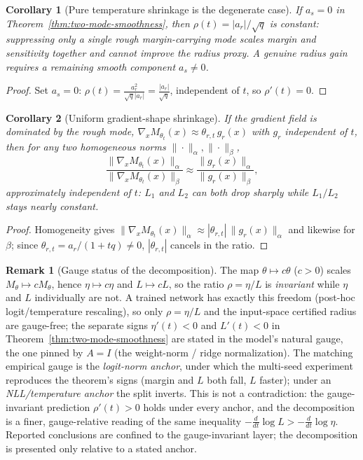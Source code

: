 \documentclass[11pt]{article}
\newtheorem{corollary}{Corollary}
\theoremstyle{definition}
\newtheorem{remark}{Remark}
\begin{document}
\begin{corollary}[Pure temperature shrinkage is the degenerate case]\label{cor:pure-temperature}
If $a_s=0$ in Theorem~\ref{thm:two-mode-smoothness}, then $\rho(t)=|a_r|/\sqrt q$ is constant: suppressing only a
single rough margin-carrying mode scales margin and sensitivity together and cannot improve the radius proxy.
A genuine radius gain requires a remaining smooth component $a_s\neq0$.
\end{corollary}
\begin{proof}
Set $a_s=0$: $\rho(t)=\tfrac{a_r^2}{\sqrt q|a_r|}=\tfrac{|a_r|}{\sqrt q}$, independent of $t$, so $\rho'(t)=0$.
\end{proof}

\begin{corollary}[Uniform gradient-shape shrinkage]\label{cor:gradient-shape}
If the gradient field is dominated by the rough mode, $\nabla_xM_{\theta_t}(x)\approx\theta_{r,t}\,g_r(x)$ with
$g_r$ independent of $t$, then for any two homogeneous norms $\|\cdot\|_\alpha,\|\cdot\|_\beta$,
\[
\frac{\|\nabla_xM_{\theta_t}(x)\|_\alpha}{\|\nabla_xM_{\theta_t}(x)\|_\beta}\approx\frac{\|g_r(x)\|_\alpha}{\|g_r(x)\|_\beta},
\]
approximately independent of $t$: $L_1$ and $L_2$ can both drop sharply while $L_1/L_2$ stays nearly constant.
\end{corollary}
\begin{proof}
Homogeneity gives $\|\nabla_xM_{\theta_t}(x)\|_\alpha\approx|\theta_{r,t}|\,\|g_r(x)\|_\alpha$ and likewise for
$\beta$; since $\theta_{r,t}=a_r/(1+tq)\neq0$, $|\theta_{r,t}|$ cancels in the ratio.
\end{proof}

\begin{remark}[Gauge status of the decomposition]\label{rem:gauge}
The map $\theta\mapsto c\theta$ ($c>0$) scales $M_\theta\mapsto cM_\theta$, hence $\eta\mapsto c\eta$ and
$L\mapsto cL$, so the ratio $\rho=\eta/L$ is \emph{invariant} while $\eta$ and $L$ individually are not. A
trained network has exactly this freedom (post-hoc logit/temperature rescaling), so only $\rho=\eta/L$ and
the input-space certified radius are gauge-free; the separate signs $\eta'(t)<0$ and $L'(t)<0$ in
Theorem~\ref{thm:two-mode-smoothness} are stated in the model's natural gauge, the one pinned by $A=I$ (the
weight-norm / ridge normalization). The matching empirical gauge is the \emph{logit-norm anchor}, under which
the multi-seed experiment reproduces the theorem's signs (margin and $L$ both fall, $L$ faster); under an
\emph{NLL/temperature anchor} the split inverts. This is not a contradiction: the gauge-invariant prediction
$\rho'(t)>0$ holds under every anchor, and the decomposition is a finer, gauge-relative reading of the same
inequality $-\tfrac{d}{dt}\log L>-\tfrac{d}{dt}\log\eta$. Reported conclusions are confined to the
gauge-invariant layer; the decomposition is presented only relative to a stated anchor.
\end{remark}
\end{document}
